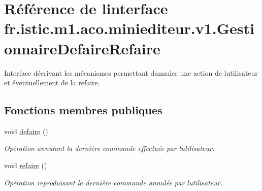 \hypertarget{interfacefr_1_1istic_1_1m1_1_1aco_1_1miniediteur_1_1v1_1_1GestionnaireDefaireRefaire}{}\section{Référence de l\textquotesingle{}interface fr.\+istic.\+m1.\+aco.\+miniediteur.\+v1.\+Gestionnaire\+Defaire\+Refaire}
\label{interfacefr_1_1istic_1_1m1_1_1aco_1_1miniediteur_1_1v1_1_1GestionnaireDefaireRefaire}


Interface décrivant les mécanismes permettant d\textquotesingle{}annuler une action de l\textquotesingle{}utilisateur et éventuellement de la refaire.  


\subsection*{Fonctions membres publiques}
\begin{DoxyCompactItemize}
\item 
\mbox{\label{interfacefr_1_1istic_1_1m1_1_1aco_1_1miniediteur_1_1v1_1_1GestionnaireDefaireRefaire_a357dd5721e9569ee2493e3bb58ba560d}} 
void \hyperlink{interfacefr_1_1istic_1_1m1_1_1aco_1_1miniediteur_1_1v1_1_1GestionnaireDefaireRefaire_a357dd5721e9569ee2493e3bb58ba560d}{defaire} ()
\begin{DoxyCompactList}\small\item\em Opération annulant la dernière commande effectuée par l\textquotesingle{}utilisateur. \end{DoxyCompactList}\item 
\mbox{\label{interfacefr_1_1istic_1_1m1_1_1aco_1_1miniediteur_1_1v1_1_1GestionnaireDefaireRefaire_a4caf33a12b146b861ac7809c8f87a4a8}} 
void \hyperlink{interfacefr_1_1istic_1_1m1_1_1aco_1_1miniediteur_1_1v1_1_1GestionnaireDefaireRefaire_a4caf33a12b146b861ac7809c8f87a4a8}{refaire} ()
\begin{DoxyCompactList}\small\item\em Opération reproduisant la dernière commande annulée par l\textquotesingle{}utilisateur. \end{DoxyCompactList}\end{DoxyCompactItemize}


